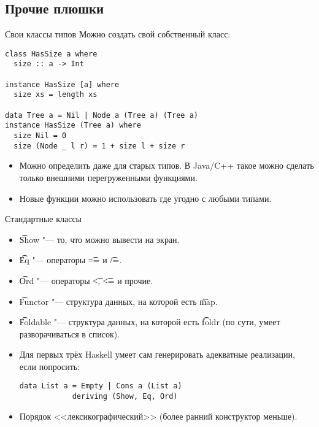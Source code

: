 \subsection{Прочие плюшки}
\begin{frame}[fragile]{Свои классы типов}
	Можно создать свой собственный класс:
\begin{verbatim}
class HasSize a where
  size :: a -> Int

instance HasSize [a] where
  size xs = length xs

data Tree a = Nil | Node a (Tree a) (Tree a)
instance HasSize (Tree a) where
  size Nil = 0
  size (Node _ l r) = 1 + size l + size r
\end{verbatim}
	\begin{itemize}
		\item
			Можно определить даже для старых типов.
			В Java/C++ такое можно сделать только внешними перегруженными функциями.
		\item Новые функции можно использовать где угодно с любыми типами.
	\end{itemize}
\end{frame}

\begin{frame}[fragile]{Стандартные классы}
	\begin{itemize}
		\item \t{Show} "--- то, что можно вывести на экран.
		\item \t{Eq} "--- операторы \t{==} и \t{/=}.
		\item \t{Ord} "--- операторы \t{<}, \t{<=} и прочие.
		\item \t{Functor} "--- структура данных, на которой есть \t{map}.
		\item \t{Foldable} "--- структура данных, на которой есть \t{foldr} (по сути, умеет разворачиваться в список).
		\item Для первых трёх Haskell умеет сам генерировать адекватные реализации, если попросить:
\begin{verbatim}
data List a = Empty | Cons a (List a)
            deriving (Show, Eq, Ord)
\end{verbatim}
		\item Порядок <<лексикографический>> (более ранний конструктор меньше).
	\end{itemize}
\end{frame}

